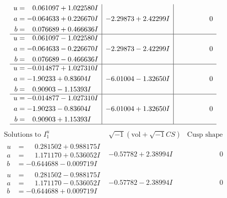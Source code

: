\documentclass[1p]{elsarticle_modified}
\theoremstyle{definition}
\newcommand{\I}{\sqrt{-1}}
\begin{document}
$$\begin{array}{c|c|c}
\begin{aligned}
u &= \phantom{-}0.061097 + 1.022580 I \\
a &= -0.064633 + 0.226670 I \\
b &= \phantom{-}0.076689 + 0.466636 I\end{aligned}
 & -2.29873 + 2.42299 I & \phantom{-0.000000 } 0 \\ \hline\begin{aligned}
u &= \phantom{-}0.061097 - 1.022580 I \\
a &= -0.064633 - 0.226670 I \\
b &= \phantom{-}0.076689 - 0.466636 I\end{aligned}
 & -2.29873 - 2.42299 I & \phantom{-0.000000 } 0 \\ \hline\begin{aligned}
u &= -0.014877 + 1.027310 I \\
a &= -1.90233 + 0.83604 I \\
b &= \phantom{-}0.90903 - 1.15393 I\end{aligned}
 & -6.01004 - 1.32650 I & \phantom{-0.000000 } 0 \\ \hline\begin{aligned}
u &= -0.014877 - 1.027310 I \\
a &= -1.90233 - 0.83604 I \\
b &= \phantom{-}0.90903 + 1.15393 I\end{aligned}
 & -6.01004 + 1.32650 I & \phantom{-0.000000 } 0\\
 \hline 
 \end{array}$$\newpage$$\begin{array}{c|c|c}  
\text{Solutions to }I^u_{1}& \I (\text{vol} + \sqrt{-1}CS) & \text{Cusp shape}\\
 \hline 
\begin{aligned}
u &= \phantom{-}0.281502 + 0.988175 I \\
a &= \phantom{-}1.171170 + 0.536052 I \\
b &= -0.644688 - 0.009719 I\end{aligned}
 & -0.57782 + 2.38994 I & \phantom{-0.000000 } 0 \\ \hline\begin{aligned}
u &= \phantom{-}0.281502 - 0.988175 I \\
a &= \phantom{-}1.171170 - 0.536052 I \\
b &= -0.644688 + 0.009719 I\end{aligned}
 & -0.57782 - 2.38994 I & \phantom{-0.000000 } 0 \\ \hline\begin{aligned}

\end{aligned}
\end{array}$$
\end{document}
